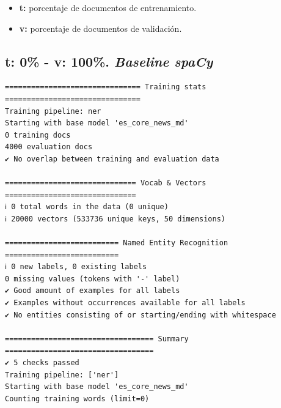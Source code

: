 \documentclass[12pt,a4paper,]{scrartcl}
\providecommand{\tightlist}{%
  \setlength{\itemsep}{0pt}\setlength{\parskip}{0pt}}
\begin{document}
\begin{itemize}
\tightlist
\item
  \textbf{t:} porcentaje de documentos de entrenamiento.
\item
  \textbf{v:} porcentaje de documentos de validación.
\end{itemize}

\hypertarget{t-0---v-100.-baseline-spacy}{%
\subsection{\texorpdfstring{t: 0\% - v: 100\%. \emph{Baseline spaCy}}{t: 0\% - v: 100\%. Baseline spaCy}}\label{t-0---v-100.-baseline-spacy}}

\begin{verbatim}
=============================== Training stats ===============================
Training pipeline: ner
Starting with base model 'es_core_news_md'
0 training docs
4000 evaluation docs
✔ No overlap between training and evaluation data

============================== Vocab & Vectors ==============================
ℹ 0 total words in the data (0 unique)
ℹ 20000 vectors (533736 unique keys, 50 dimensions)

========================== Named Entity Recognition ==========================
ℹ 0 new labels, 0 existing labels
0 missing values (tokens with '-' label)
✔ Good amount of examples for all labels
✔ Examples without occurrences available for all labels
✔ No entities consisting of or starting/ending with whitespace

================================== Summary ==================================
✔ 5 checks passed
Training pipeline: ['ner']
Starting with base model 'es_core_news_md'
Counting training words (limit=0)
\end{verbatim}
\end{document}
